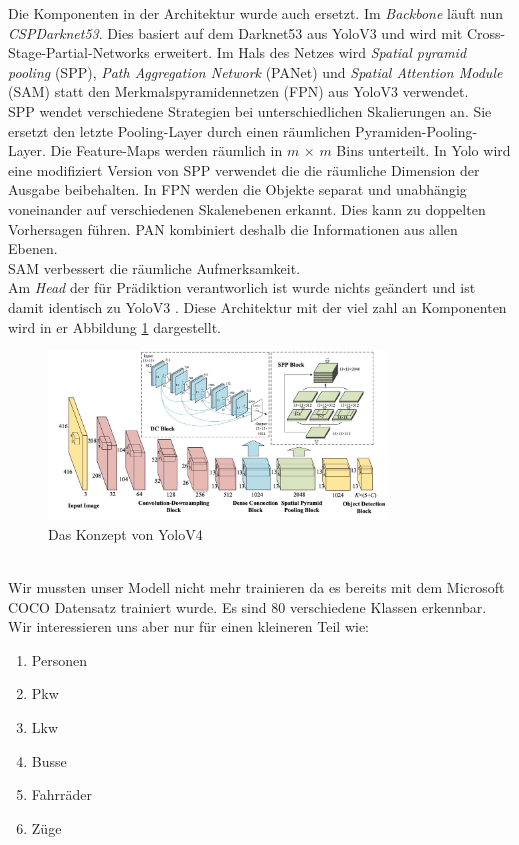 \documentclass[conference]{IEEEtran}
\begin{document}
	Die Komponenten in der Architektur wurde auch ersetzt. Im \textit{Backbone} läuft nun \textit{CSPDarknet53}. Dies basiert auf dem Darknet53 aus YoloV3 und wird mit Cross-Stage-Partial-Networks erweitert. Im Hals des Netzes wird \textit{Spatial pyramid pooling} (SPP), \textit{Path Aggregation Network} (PANet) und \textit{Spatial Attention Module} (SAM) statt den Merkmalspyramidennetzen (FPN) aus YoloV3 verwendet.\\
	SPP wendet verschiedene Strategien bei unterschiedlichen Skalierungen an. Sie ersetzt den letzte Pooling-Layer durch einen räumlichen Pyramiden-Pooling-Layer. Die Feature-Maps werden räumlich in $m$ × $m$ Bins unterteilt. In Yolo wird eine modifiziert Version von SPP verwendet die die räumliche Dimension der Ausgabe beibehalten.
	In FPN werden die Objekte separat und unabhängig voneinander auf verschiedenen Skalenebenen erkannt. Dies kann zu doppelten Vorhersagen führen. PAN kombiniert deshalb die Informationen aus allen Ebenen.\\
	SAM verbessert die räumliche Aufmerksamkeit.\\
	Am \textit{Head} der für Prädiktion verantworlich ist wurde nichts geändert und  ist damit identisch zu YoloV3 \cite{b2}\cite{b8}. Diese Architektur mit der viel zahl an Komponenten wird in er Abbildung \ref{V4Arch} dargestellt.
	\begin{figure}[!h]
		\begin{center}
			\includegraphics[width=9cm]{Media/YoloV4Arch.jpeg}
			\caption{Das Konzept von YoloV4 \cite{b8}}
			\label{V4Arch}
		\end{center}
	\end{figure}\\
	Wir mussten unser Modell nicht mehr trainieren da es bereits mit dem Microsoft COCO Datensatz trainiert wurde. Es sind 80 verschiedene Klassen erkennbar. Wir interessieren uns aber nur für einen kleineren Teil wie:
	\begin{enumerate}
		\item Personen
		\item Pkw
		\item Lkw
		\item Busse
		\item Fahrräder
		\item Züge
	\end{enumerate}
\end{document}

